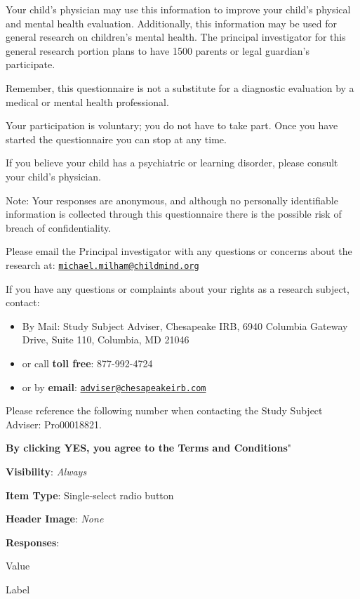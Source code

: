 \documentclass[]{book}
\begin{document}
Your child's physician may use this information to improve your child's physical and mental health evaluation. Additionally, this information may be used for general research on children's mental health. The principal investigator for this general research portion plans to have 1500 parents or legal guardian's participate.

Remember, this questionnaire is not a substitute for a diagnostic evaluation by a medical or mental health professional.

Your participation is voluntary; you do not have to take part. Once you have started the questionnaire you can stop at any time.

If you believe your child has a psychiatric or learning disorder, please consult your child's physician.

Note: Your responses are anonymous, and although no personally identifiable information is collected through this questionnaire there is the possible risk of breach of confidentiality.

Please email the Principal investigator with any questions or concerns about the research at: \href{mailto:michael.milham@childmind.org}{\nolinkurl{michael.milham@childmind.org}}

If you have any questions or complaints about your rights as a research subject, contact:

\begin{itemize}
\item
  By Mail: Study Subject Adviser, Chesapeake IRB, 6940 Columbia Gateway Drive, Suite 110, Columbia, MD 21046
\item
  or call \textbf{toll free}: 877-992-4724
\item
  or by \textbf{email}: \href{mailto:adviser@chesapeakeirb.com}{\nolinkurl{adviser@chesapeakeirb.com}}
\end{itemize}

Please reference the following number when contacting the Study Subject Adviser: Pro00018821.

\textbf{By clicking YES, you agree to the Terms and Conditions}"

\textbf{Visibility}: \emph{Always}

\textbf{Item Type}: Single-select radio button

\textbf{Header Image}: \emph{None}

\textbf{Responses}:

Value

Label
\end{document}
